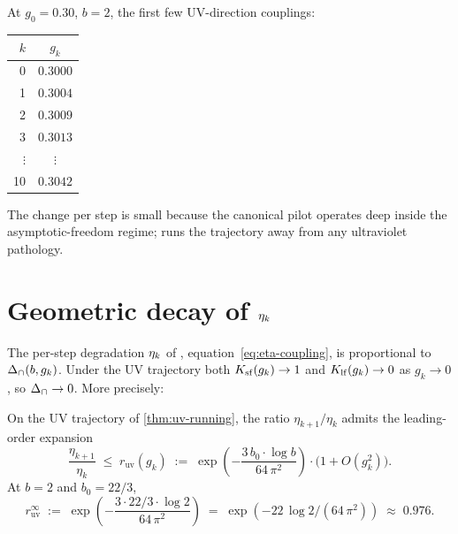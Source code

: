 \begin{infobox}[main][title=Canonical-pilot UV trajectory]
At $g_0 = 0.30$, $b = 2$, the first few UV-direction couplings:
\begin{center}\small
\begin{tabular}{rc}
\toprule
$k$ & $g_k$    \\
\midrule
0   & $0.3000$ \\
1   & $0.3004$ \\
2   & $0.3009$ \\
3   & $0.3013$ \\
$\vdots$ & $\vdots$ \\
10  & $0.3042$ \\
\bottomrule
\end{tabular}
\end{center}
The change per step is small because the canonical pilot operates
deep inside the asymptotic-freedom regime;
 runs the trajectory away from any
ultraviolet pathology.
\end{infobox}

\section{Geometric decay of \texorpdfstring{$\eta_k$}{eta\_k}}
\label{sec:eta-geometric-decay}

%

The per-step degradation $\eta_k$ of ,
equation~\eqref{eq:eta-coupling}, is proportional to $\Delta_{\cap}(b, g_k)$.
Under the UV trajectory both $K_{\mathrm{sf}}(g_k) \to 1$ and $K_{\mathrm{lf}}(g_k) \to
0$ as $g_k \to 0$, so $\Delta_{\cap} \to 0$.  More precisely:

\begin{theorem}
\label{thm:eta-geometric}
On the UV trajectory of \cref{thm:uv-running}, the ratio
$\eta_{k+1} / \eta_k$ admits the leading-order expansion
\begin{equation}
  \label{eq:eta-decay-rate}
  \frac{\eta_{k+1}}{\eta_k}
  \;\le\;
  r_{\mathrm{uv}}(g_k)
  \;:=\;
  \exp\!\left(-\frac{3\,b_0 \cdot \log b}{64\,\pi^2}\right) \cdot
    \bigl(1 + O(g_k^2)\bigr) .
\end{equation}
At $b = 2$ and $b_0 = 22/3$,
\begin{equation}
  \label{eq:r-uv-value}
  r_{\mathrm{uv}}^\infty \;:=\; \exp\!\left(-\frac{3 \cdot 22/3 \cdot \log 2}{64\,\pi^2}\right)
  \;=\; \exp(-22\,\log 2 / (64\,\pi^2))
  \;\approx\; 0.976 .
\end{equation}
\end{theorem}


